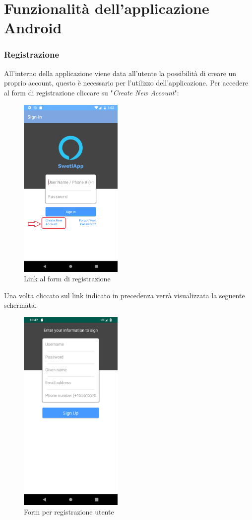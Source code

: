 \clearpage
\section{Funzionalità dell'applicazione  Android}
\label{sec:sec_funzionalita_applicazione}
\subsubsection{Registrazione}
\label{sec:funzionalita_applicazione_registrazione}
All'interno della applicazione viene data all'utente la possibilità di creare un proprio account, questo è necessario per l'utilizzo dell'applicazione. Per accedere al form di registrazione cliccare su "\textit{Create New Account}":
\begin{figure}[H]
	\centering
	\includegraphics[width=5cm]{../includes/pics/app_registration_form_1.png}
	\caption{\label{fig:app_registration_form_1}Link al form di registrazione}
\end{figure}
Una volta cliccato sul link indicato in precedenza verrà visualizzata la seguente schermata.
\begin{figure}[H]
	\centering
	\includegraphics[width=5cm]{../includes/pics/app_registration_form.png}
	\caption{\label{fig:app_registration_form}Form per registrazione utente}
\end{figure}
